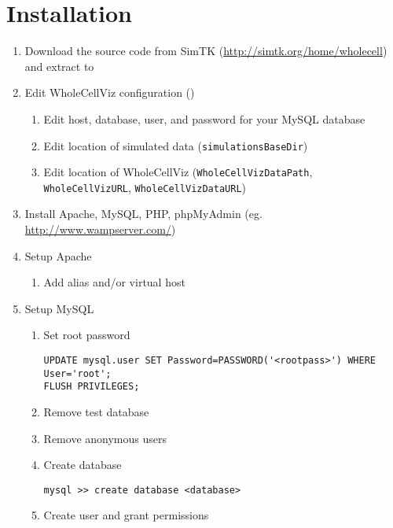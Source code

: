 \documentclass[twoside]{book}
\makeatletter
\def\cleardoublepage{\clearpage\if@twoside \ifodd\c@page\else
		\thispagestyle{empty}\hbox{}\newpage\if@twocolumn\hbox{}\newpage\fi\fi\fi}
\def\cleardoublepage{\clearpage}
\makeatother
\begin{document}
\cleardoublepage
\pagestyle{plain}

\tableofcontents

\cleardoublepage
\mainmatter

\chapter{Installation}
\begin{enumerate}
\item Download the source code from SimTK (\url{http://simtk.org/home/wholecell}) and extract to 
\item Edit WholeCellViz configuration ()
	\begin{enumerate}
	\item Edit host, database, user, and password for your MySQL database
	\item Edit location of simulated data (\texttt{simulationsBaseDir})
	\item Edit location of WholeCellViz (\texttt{WholeCellVizDataPath}, \texttt{WholeCellVizURL}, \texttt{WholeCellVizDataURL})
	\end{enumerate}
\item Install Apache, MySQL, PHP, phpMyAdmin (eg. \url{http://www.wampserver.com/})
\item Setup Apache
	\begin{enumerate}
	\item Add alias and/or virtual host
	\end{enumerate}
\item Setup MySQL
	\begin{enumerate}
	\item Set root password
		\begin{verbatim}
UPDATE mysql.user SET Password=PASSWORD('<rootpass>') WHERE User='root';
FLUSH PRIVILEGES;
		\end{verbatim}
	\item Remove test database
	\item Remove anonymous users
	\item Create database
		\begin{verbatim}
mysql >> create database <database>
		\end{verbatim}
	\item Create user and grant permissions

\end{enumerate}
\end{enumerate}
\end{document}
